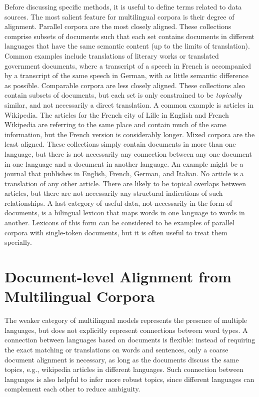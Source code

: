 Before discussing specific methods, it is useful to define terms related to data sources.
The most salient feature for multilingual corpora is their degree of alignment.
Parallel corpora are the most closely aligned. These collections comprise subsets of documents such that each set contains documents in different languages that have the same semantic content (up to the limits of translation).
Common examples include translations of literary works or translated government documents, where a transcript of a speech in French is accompanied by a transcript of the  same speech in German, with as little semantic difference as possible.
Comparable corpora are less closely aligned. 
These collections also contain subsets of documents, but each set is only constrained to be {\em topically} similar, and not necessarily a direct translation.
A common example is articles in Wikipedia.
The articles for the French city of Lille in English and French Wikipedia are referring to the same place and contain much of the same information, but the French version is considerably longer.
Mixed corpora are the least aligned. These collections simply contain documents in more than one language, but there is not necessarily any connection between any one document in one language and a document in another language.
An example might be a journal that publishes in English, French, German, and Italian.
No article is a translation of any other article.
There are likely to be topical overlaps between articles, but there are not necessarily any structural indications of such relationships.
A last category of useful data, not necessarily in the form of documents, is a bilingual lexicon that maps words in one language to words in another.
Lexicons of this form can be considered to be examples of parallel corpora with single-token documents, but it is often useful to treat them specially.

\section{Document-level Alignment from Multilingual Corpora}

The weaker category of multilingual models represents the presence of multiple languages, but does not explicitly represent connections between word types.
A connection between languages based on documents is flexible: instead of requiring
the exact matching or translations on words and sentences, only a
coarse document alignment is necessary, as long as the documents
discuss the same topics, e.g., wikipedia articles in different
languages. Such connection between languages is also helpful to infer
more robust topics, since different languages can complement each
other to reduce ambiguity.

